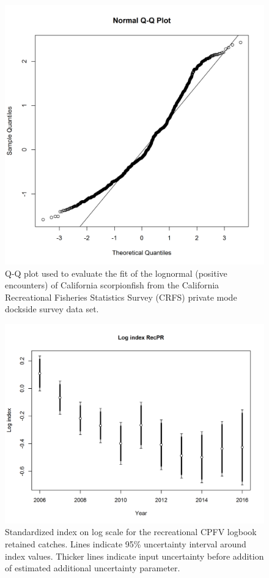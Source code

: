 \documentclass[12pt,]{article}
\begin{document}
\FloatBarrier 

\begin{figure}[htbp]
\centering
\includegraphics{Figures/Fleet4_RecPR_dockside_QQ.png}
\caption{Q-Q plot used to evaluate the fit of the lognormal (positive
encounters) of California scorpionfish from the California Recreational
Fisheries Statistics Survey (CRFS) private mode dockside survey data
set. \label{fig:Fleet4_RecPR_dockside_QQ}}
\end{figure}

\begin{figure}[htbp]
\centering
\includegraphics{r4ss/plots_mod1/index4_logcpuedata_RecPR.png}
\caption{Standardized index on log scale for the recreational CPFV
logbook retained catches. Lines indicate 95\% uncertainty interval
around index values. Thicker lines indicate input uncertainty before
addition of estimated additional uncertainty parameter.
\label{fig:index4_logcpuedata_RecPR}}
\end{figure}
\end{document}
